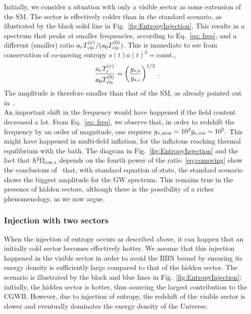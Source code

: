 \documentclass[a4paper,11pt]{article}
\newcommand{\tem}[2]{T_{\tiny{#1}}^{(#2)}}
\newcommand{\lr}[1]{\left(#1\right)}
\newcommand{\tti}[1]{\text{\tiny{#1}}}
\begin{document}
Initially, we consider a situation with only a visible sector as some extension of the SM.
The sector is effectively colder than in the standard scenario, as illustrated by the black solid line in Fig.~\ref{fig:EntropyInjection}. 
This results in a spectrum that peaks at smaller frequencies, according to Eq.~\eqref{eq: freq}, and a different (smaller) ratio $a_{r}\tem{\text{vis}}{r}/(a_0\tem{\text{vis}}{0})$. This is immediate to see from conservation of co-moving entropy $s(t)a(t)^3=\text{const.}$,
\begin{equation}\label{eq:comoving}
    \frac{a_r\tem{i}{r}}{a_0\tem{\text{vis}}{0}}=\lr{\frac{g_{*,\tti{0}}}{g_{*,\tti{r}}}}^{1/3} \, .
\end{equation}
The amplitude is therefore smaller than that of the SM, as already pointed out in~\cite{Ringwald:2020ist}.\\

An important shift in the frequency would have happened if the field content decreased a lot. 
From Eq.~\eqref{eq: freq}, we observe that, in order to redshift the frequency by an order of magnitude, one requires $g_{*,\text{\tiny{BSM}}}=10^3 g_{*,\text{\tiny{SM}}} \sim 10^5.$ 
This might have happened in multi-field inflation, for the inflatons reaching thermal equilibrium with the bath.
The diagram in Fig.~\ref{fig:EntropyInjection} and the fact that $h^2\Omega_{\tti{GW,0}}$ depends on the fourth power of the ratio~\eqref{eq:comoving} show the conclusions of~\cite{Ringwald:2020ist} that, with standard equation of state, the standard scenario shows the biggest amplitude for the GW spectrum. 
This remains true in the presence of hidden sectors, although there is the possibility of a richer phenomenology, as we now argue. 

\subsubsection*{Injection with two sectors}\label{sec: inject2sectors}

When the injection of entropy occurs as described above, it can happen that an initially cold sector becomes effectively hotter. We assume that this injection happened in the visible sector in order to avoid the BBN bound by ensuring its energy density is sufficiently large compared to that of the hidden sector. The scenario is illustrated by the black and blue lines in Fig.~\ref{fig:EntropyInjection}:
initially, the hidden sector is hotter, thus sourcing the largest contribution to the CGWB. However, due to injection of entropy, the redshift of the visible sector is slower and eventually dominates the energy density of the Universe.
\end{document}
